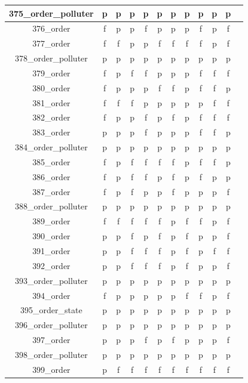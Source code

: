 \documentclass[
fancyheadings, %
%
%
]{stsreprt}
\begin{document}
\begin{longtable}{|c|c|c|c|c|c|c|c|c|c|c|c|}
375\_order\_polluter & p & p & p & p & p & p & p & p & p & p \\
\hline
376\_order & f & p & p & f & p & p & p & f & p & f \\
\hline
377\_order & f & f & p & p & f & f & f & f & p & f \\
\hline
378\_order\_polluter & p & p & p & p & p & p & p & p & p & p \\
\hline
379\_order & f & p & f & f & p & p & p & f & f & f \\
\hline
380\_order & f & p & p & p & f & f & p & f & f & p \\
\hline
381\_order & f & f & f & p & p & p & p & p & f & f \\
\hline
382\_order & f & p & p & f & p & f & p & f & f & f \\
\hline
383\_order & p & p & p & f & p & p & p & f & f & p \\
\hline
384\_order\_polluter & p & p & p & p & p & p & p & p & p & p \\
\hline
385\_order & f & p & f & f & f & f & p & f & f & p \\
\hline
386\_order & f & p & f & f & p & f & p & f & p & p \\
\hline
387\_order & f & p & f & p & p & f & p & p & p & f \\
\hline
388\_order\_polluter & p & p & p & p & p & p & p & p & p & p \\
\hline
389\_order & f & f & f & f & f & p & f & f & p & f \\
\hline
390\_order & p & p & f & p & f & p & f & p & p & f \\
\hline
391\_order & p & p & f & f & f & p & f & p & f & f \\
\hline
392\_order & p & p & f & f & f & p & f & p & p & f \\
\hline
393\_order\_polluter & p & p & p & p & p & p & p & p & p & p \\
\hline
394\_order & f & p & p & p & p & p & f & f & p & f \\
\hline
395\_order\_state & p & p & p & p & p & p & p & p & p & p \\
\hline
396\_order\_polluter & p & p & p & p & p & p & p & p & p & p \\
\hline
397\_order & p & p & p & f & p & f & p & p & p & f \\
\hline
398\_order\_polluter & p & p & p & p & p & p & p & p & p & p \\
\hline
399\_order & p & f & f & f & f & f & f & f & f & f \\
\hline

\end{longtable}
\end{document}
